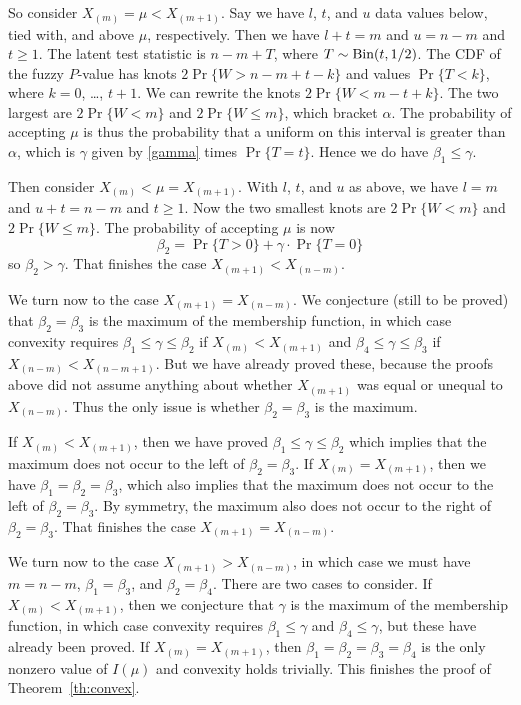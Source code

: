 \documentclass{article}
\newcommand{\BinomialDis}{\text{\upshape Bin}}
\begin{document}
So consider $X_{(m)} = \mu < X_{(m + 1)}$.
Say we have $l$, $t$, and $u$ data values below, tied with, and above
$\mu$, respectively.
Then we have $l + t = m$ and $u = n - m$ and $t \ge 1$.
The latent test statistic is $n - m + T$,
where $T \sim \BinomialDis(t, 1 / 2)$.
The CDF of the fuzzy $P$-value has
knots $2 \Pr\{ W > n - m + t - k \}$ and
values $\Pr\{ T < k \}$, where $k = 0$, \ldots, $t + 1$.
We can rewrite the
knots $2 \Pr\{ W < m - t + k \}$.  The two largest
are $2 \Pr \{ W < m \}$ and $2 \Pr \{ W \le m \}$, which bracket $\alpha$.
The probability of accepting $\mu$ is thus the probability that a uniform
on this interval is greater than $\alpha$, which is $\gamma$ given by
\eqref{gamma} times $\Pr \{ T = t \}$.  Hence we do have $\beta_1 \le \gamma$.

Then consider $X_{(m)} < \mu = X_{(m + 1)}$.
With $l$, $t$, and $u$ as above,
we have $l = m$ and $u + t = n - m$ and $t \ge 1$.
Now the two smallest knots
are $2 \Pr \{ W < m \}$ and $2 \Pr \{ W \le m \}$.
The probability of accepting $\mu$ is now
$$
   \beta_2 = \Pr\{ T > 0 \} + \gamma \cdot \Pr \{ T = 0 \}
$$
so $\beta_2 > \gamma$.
That finishes the case $X_{(m + 1)} < X_{(n - m)}$.

We turn now to the case $X_{(m + 1)} = X_{(n - m)}$.  We conjecture
(still to be proved)
that $\beta_2 = \beta_3$ is the maximum of the membership function,
in which case convexity requires
$\beta_1 \le \gamma \le \beta_2$ if $X_{(m)} < X_{(m + 1)}$
and
$\beta_4 \le \gamma \le \beta_3$ if $X_{(n - m)} < X_{(n - m + 1)}$.
But we have already proved these, because the proofs above did not assume
anything about whether $X_{(m + 1)}$ was equal or unequal to $X_{(n - m)}$.
Thus the only issue is whether $\beta_2 = \beta_3$ is the maximum.

If $X_{(m)} < X_{(m + 1)}$, then we have
proved $\beta_1 \le \gamma \le \beta_2$ which implies that the maximum
does not occur to the left of $\beta_2 = \beta_3$.
If $X_{(m)} = X_{(m + 1)}$, then we have $\beta_1 = \beta_2 = \beta_3$,
which also implies that the maximum
does not occur to the left of $\beta_2 = \beta_3$.
By symmetry, the maximum also
does not occur to the right of $\beta_2 = \beta_3$.
That finishes the case $X_{(m + 1)} = X_{(n - m)}$.

We turn now to the case $X_{(m + 1)} > X_{(n - m)}$, in which case we
must have $m = n - m$, $\beta_1 = \beta_3$, and $\beta_2 = \beta_4$.
There are two cases to consider.  If $X_{(m)} < X_{(m + 1)}$, then
we conjecture that $\gamma$ is the maximum of the membership function,
in which case convexity requires $\beta_1 \le \gamma$ and $\beta_4 \le \gamma$,
but these have already been proved.
If $X_{(m)} = X_{(m + 1)}$, then $\beta_1 = \beta_2 = \beta_3 = \beta_4$ is
the only nonzero value of $I(\mu)$ and convexity holds trivially.
This finishes the proof of Theorem~\ref{th:convex}.
\end{document}
